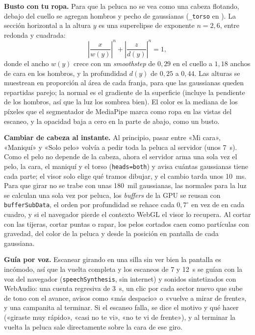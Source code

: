 \textbf{Busto con tu ropa.} Para que la peluca no se vea como una cabeza flotando, debajo del cuello se agregan hombros y pecho de gaussianas (\texttt{\_torso} en ). La sección horizontal a la altura $y$ es una superelipse de exponente $n=2{,}6$, entre redonda y cuadrada:
\begin{equation}
  \left|\frac{x}{w(y)}\right|^{n}+\left|\frac{z}{d(y)}\right|^{n}=1,
\end{equation}
donde el ancho $w(y)$ crece con un \emph{smoothstep} de $0{,}29$ en el cuello a $1{,}18$ anchos de cara en los hombros, y la profundidad $d(y)$ de $0{,}25$ a $0{,}44$. Las alturas se muestrean en proporción al área de cada franja, para que las gaussianas queden repartidas parejo; la normal es el gradiente de la superficie (incluye la pendiente de los hombros, así que la luz los sombrea bien). El color es la mediana de los píxeles que el segmentador de MediaPipe marca como ropa en las vistas del escaneo, y la opacidad baja a cero en la parte de abajo, como un busto.

\textbf{Cambiar de cabeza al instante.} Al principio, pasar entre «Mi cara», «Maniquí» y «Solo pelo» volvía a pedir toda la peluca al servidor (unos 7~s). Como el pelo no depende de la cabeza, ahora el servidor arma una sola vez el pelo, la cara, el maniquí y el torso (\texttt{heads=both}) y avisa cuántas gaussianas tiene cada parte; el visor solo elige qué tramos dibujar, y el cambio tarda unos 10~ms. Para que girar no se trabe con unas 180~mil gaussianas, las normales para la luz se calculan una sola vez por peluca, los \emph{buffers} de la GPU se reusan con \texttt{bufferSubData}, el orden por profundidad se rehace cada $0{,}7^\circ$ en vez de en cada cuadro, y si el navegador pierde el contexto WebGL el visor lo recupera. Al cortar con las tijeras, cortar puntas o rapar, los pelos cortados caen como partículas con gravedad, del color de la peluca y desde la posición en pantalla de cada gaussiana.

\textbf{Guía por voz.} Escanear girando en una silla sin ver bien la pantalla es incómodo, así que la vuelta completa y los escaneos de 7 y 12~s se guían con la voz del navegador (\texttt{speechSynthesis}, sin internet) y sonidos sintetizados con WebAudio: una cuenta regresiva de 3~s, un clic por cada sector nuevo que sube de tono con el avance, avisos como «más despacio» o «vuelve a mirar de frente», y una campanita al terminar. Si el escaneo falla, se dice el motivo y qué hacer («giraste muy rápido», «casi no te vi», «no te vi de frente»), y al terminar la vuelta la peluca sale directamente sobre la cara de ese giro.

